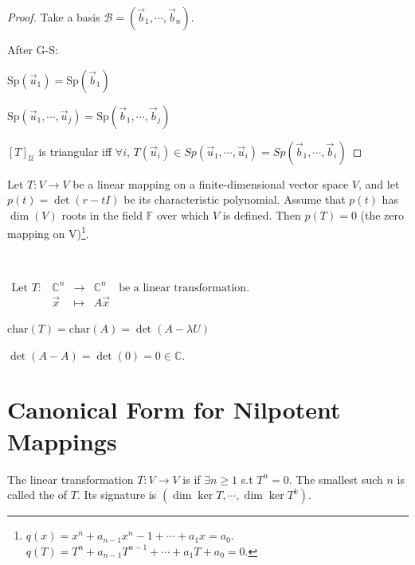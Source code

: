 \documentclass[11pt,fleqn]{book} %
\begin{document}
\begin{proof}
    Take a basis $\mathcal{B} = (\vec{b}_1, \cdots, \vec{b}_n)$.

    After G-S:

    $\mathrm{Sp}(\vec{u}_1) = \mathrm{Sp}(\vec{b}_1)$

    $\mathrm{Sp}(\vec{u}_1, \cdots, \vec{u}_j) = \mathrm{Sp}(\vec{b}_1, \cdots, \vec{b}_j)$

    $[T]_\mathcal{U}$ is triangular iff $\forall i$, $T(\vec{u}_i)\in Sp(\vec{u}_1, \cdots, \vec{u}_i) = Sp(\vec{b}_1, \cdots, \vec{b}_i)$
\end{proof}

\setcounter{chapter}{6}
\setcounter{dummy}{11}
\begin{theorem}
    Let $T: V \to V$ be a linear mapping on a finite-dimensional vector space $V$, and let $p(t) = \det(r - tI)$ be its characteristic polynomial. Assume that $p(t)$ has $\dim(V)$ roots in the field $\mathbb{F}$ over which $V$ is defined. Then $p(T) = 0$ (the zero mapping on V)\footnote{$q(x) = x^n + a_{n-1}x^n-1 + \cdots +a_1x = a_0$. $q(T) = T^n + a_{n-1}T^{n-1}+\cdots+a_1T + a_0 = 0$. }.
\end{theorem}
\setcounter{chapter}{4}

\begin{example}
{~~~}

    $\begin{matrix}\text{Let } T: &\mathbb{C}^n &\to &\mathbb{C}^n &\text{be a linear transformation. }\\ &\vec{x} &\mapsto &A\vec{x} \end{matrix}$

    $\mathrm{char}(T) = \mathrm{char}(A) = \det(A - \lambda U)$

    $\det(A - A) = \det(0) = 0 \in \mathbb{C}$.
\end{example}

\section{Canonical Form for Nilpotent Mappings}
\setcounter{section}{0}
\setcounter{definitionT}{2}
\begin{definition}[Niplotent]
    The linear transformation $T: V \to V$ is  if $\exists n \ge 1$ s.t $T^n = 0$. The smallest such $n$ is called the  of $T$. Its signature is $(\dim \ker T, \cdots, \dim\ker T^k)$.
\end{definition}
\end{document}
